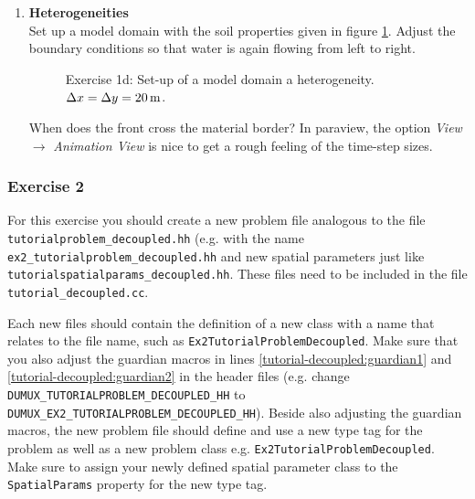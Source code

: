\begin{enumerate}
\item \textbf{Heterogeneities}  \\
Set up a model domain with the soil properties given in figure \ref{tutorial-deoucpled:exercise1_d}.
Adjust the boundary conditions so that water is again flowing from left to right.
\begin{figure}[bt]
\centering
{}
\caption{Exercise 1d: Set-up of a model domain a heterogeneity. $\Delta x = \Delta y = \unit[20]{m}$.}
\label{tutorial-deoucpled:exercise1_d}
\end{figure}
When does the front cross the material border? In paraview, the option
\textit{View} $\rightarrow$ \textit{Animation View} is nice to get a rough
feeling of the time-step sizes.
\end{enumerate}

\subsubsection{Exercise 2}
For this exercise you should create a new problem file analogous to
the file \texttt{tutorialproblem\_decoupled.hh} (e.g. with the name
\texttt{ex2\_tutorialproblem\_decoupled.hh} and new spatial parameters
just like \texttt{tutorialspatialparams\_decoupled.hh}. These files need to
be included in the file \texttt{tutorial\_decoupled.cc}.

Each new files should contain the definition of a new class with a
name that relates to the file name, such as \texttt{Ex2TutorialProblemDecoupled}.
Make sure that you also adjust the guardian
macros in lines \ref{tutorial-decoupled:guardian1} and \ref{tutorial-decoupled:guardian2}
 in the header files (e.g. change \\
\texttt{DUMUX\_TUTORIALPROBLEM\_DECOUPLED\_HH} to
\texttt{DUMUX\_EX2\_TUTORIALPROBLEM\_DECOUPLED\_HH}).  Beside also adjusting the guardian macros,
the new problem file should define and use a new type tag for the problem as well as a new problem class
e.g. \texttt{Ex2TutorialProblemDecoupled}. Make sure to assign your newly defined spatial
parameter class to the \texttt{SpatialParams} property for the new
type tag.

